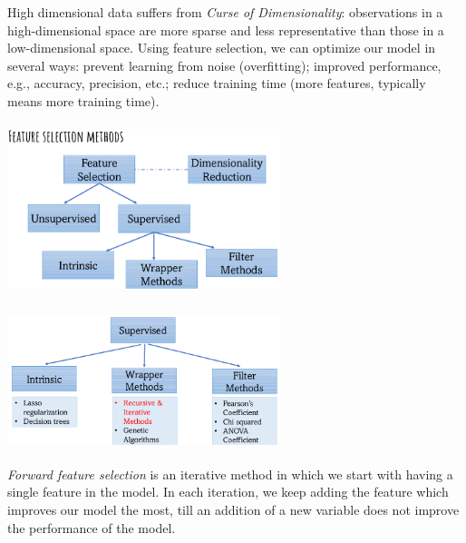 \documentclass{article}
\begin{document}
High dimensional data suffers from \emph{Curse of Dimensionality}: observations in a high-dimensional space are more sparse and less representative than those in a low-dimensional space. Using feature selection, we can optimize our model in several ways: prevent learning from noise (overfitting); improved performance, e.g., accuracy, precision, etc.; reduce training time (more features, typically means more training time).

\bigskip

\begin{minipage}{0.45\linewidth}
	\centering\includegraphics[width=8cm, height=5cm]{img/feat_selection.png}	
\end{minipage}
\hfill
\begin{minipage}{0.45\linewidth}
\includegraphics[width=8cm, height=4cm]{img/feat_selection2.png}	
\end{minipage}


\bigskip
\raggedright \emph{Forward feature selection} is an iterative method in which we start with having a single feature in the model. In each iteration, we keep adding the feature which improves our model the most, till an addition of a new variable does not improve the performance of the model.
\bigskip
\end{document}

